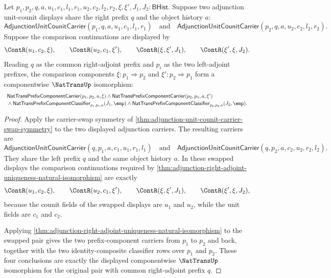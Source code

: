 \begin{theorem}
\label{thm:adjunction-left-adjoint-uniqueness-natural-isomorphism}
Let $p_1,p_2,q,a,u_1,c_1,l_1,r_1,u_2,c_2,l_2,r_2,\xi,\xi',J_1,J_2:\mathsf{BHist}$.
Suppose two adjunction unit-counit displays share the right prefix $q$ and the object history $a$:
$$
\mathsf{AdjunctionUnitCounitCarrier}(p_1,q,a,u_1,c_1,l_1,r_1)
\quad\text{and}\quad
\mathsf{AdjunctionUnitCounitCarrier}(p_2,q,a,u_2,c_2,l_2,r_2).
$$
Suppose the comparison continuations are displayed by
$$
\ContR(u_1,c_2,\xi),\qquad
\ContR(u_2,c_1,\xi'),\qquad
\ContR(\xi,\xi',J_1),\qquad
\ContR(\xi',\xi,J_2).
$$
Reading $q$ as the common right-adjoint prefix and $p_i$ as the two left-adjoint prefixes, the comparison components $\xi:p_1\Rightarrow p_2$ and $\xi':p_2\Rightarrow p_1$ form a componentwise $\NatTransUp$ isomorphism:
$$
\begin{array}{l}
\mathsf{NatTransPrefixComponentCarrier}(p_1,p_2,a,\xi)\land
\mathsf{NatTransPrefixComponentCarrier}(p_2,p_1,a,\xi')\\[2pt]
{}\land
\mathsf{NatTransPrefixComponentClassifier}_{p_1,p_1,a}(J_1,\emp)
\land
\mathsf{NatTransPrefixComponentClassifier}_{p_2,p_2,a}(J_2,\emp).
\end{array}
$$
\end{theorem}
\begin{proof}
Apply the carrier-swap symmetry of \autoref{thm:adjunction-unit-counit-carrier-swap-symmetry} to the two displayed adjunction carriers. The resulting carriers are
$$
\mathsf{AdjunctionUnitCounitCarrier}(q,p_1,a,c_1,u_1,r_1,l_1)
\quad\text{and}\quad
\mathsf{AdjunctionUnitCounitCarrier}(q,p_2,a,c_2,u_2,r_2,l_2).
$$
They share the left prefix $q$ and the same object history $a$. In these swapped displays the comparison continuations required by \autoref{thm:adjunction-right-adjoint-uniqueness-natural-isomorphism} are exactly
$$
\ContR(u_1,c_2,\xi),\qquad
\ContR(u_2,c_1,\xi'),\qquad
\ContR(\xi,\xi',J_1),\qquad
\ContR(\xi',\xi,J_2),
$$
because the counit fields of the swapped displays are $u_1$ and $u_2$, while the unit fields are $c_1$ and $c_2$.

Applying \autoref{thm:adjunction-right-adjoint-uniqueness-natural-isomorphism} to the swapped pair gives the two prefix-component carriers from $p_1$ to $p_2$ and back, together with the two identity-composite classifier rows over $p_1$ and $p_2$. These four conclusions are exactly the displayed componentwise $\NatTransUp$ isomorphism for the original pair with common right-adjoint prefix $q$.
\end{proof}

